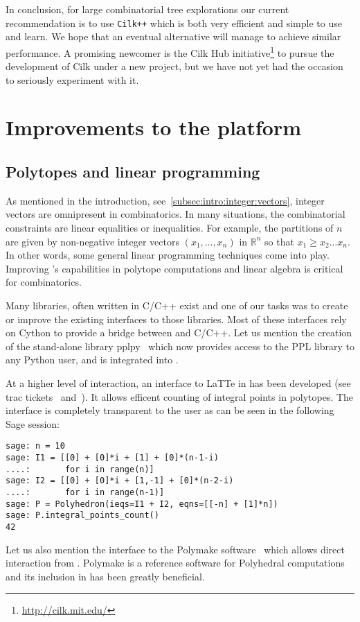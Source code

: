 \documentclass{deliverablereport}
\newcommand{\CilkP}{\texttt{Cilk++}\xspace}
\begin{document}
In conclusion, for large combinatorial tree explorations our current
recommendation is to use \CilkP which is both very efficient and simple to use
and learn. We hope that an eventual alternative will manage to achieve similar
performance. A promising newcomer is the Cilk Hub initiative\footnote{\url{http://cilk.mit.edu/}}
to pursue the development of Cilk under a new project, but we have not yet had the occasion to seriously
experiment with it.




\section{Improvements to the \Sage platform}


\subsection{Polytopes and linear programming}
\label{subsec:polytopes}

As mentioned in the introduction, see~\ref{subsec:intro:integer:vectors},
integer vectors are omnipresent in combinatorics. In many situations,
the combinatorial constraints are linear equalities or inequalities.
For example, the partitions of $n$ are given by non-negative integer
vectors $(x_1, \ldots, x_n)$ in $\mathbb{R}^n$ so that $x_1 \geq x_2 \ldots x_n$.
In other words, some general linear programming techniques come into
play. Improving \Sage's capabilities in polytope computations and linear algebra
is critical for combinatorics.

Many libraries, often written in C/C++ exist and one of our tasks was to
create or improve the existing \Sage interfaces to those libraries. Most of these interfaces
rely on Cython to provide a bridge between \Python and C/C++. Let
us mention the creation of the stand-alone library pplpy~\cite{pplpy-code} which now provides
access to the PPL library to any Python user, and is integrated into \Sage.

At a higher level of interaction, an interface to LaTTe in \Sage has
been developed (see trac tickets~\cite{trac-18211}
and~\cite{trac-22497}). It allows efficent counting of
integral points in polytopes. The interface is completely transparent to the
user as can be seen in the following Sage session:
\begin{verbatim}
sage: n = 10
sage: I1 = [[0] + [0]*i + [1] + [0]*(n-1-i)
....:       for i in range(n)]
sage: I2 = [[0] + [0]*i + [1,-1] + [0]*(n-2-i)
....:       for i in range(n-1)]
sage: P = Polyhedron(ieqs=I1 + I2, eqns=[[-n] + [1]*n])
sage: P.integral_points_count()
42
\end{verbatim}
Let us also mention the \Sage interface to the Polymake
software~\cite{polymake-code} which allows direct interaction from
\Sage. Polymake is a reference software for Polyhedral computations
and its inclusion in \Sage has been greatly beneficial.
\end{document}
